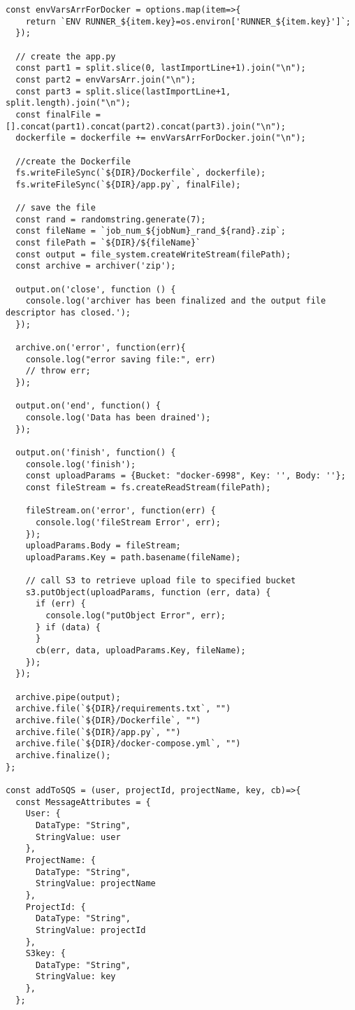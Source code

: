 \documentclass[12pt,oneside]{amsart}
\begin{document}
\begin{Verbatim}[fontsize=\tiny, frame=single]
  const envVarsArrForDocker = options.map(item=>{
    return `ENV RUNNER_${item.key}=os.environ['RUNNER_${item.key}']`;
  });

  // create the app.py
  const part1 = split.slice(0, lastImportLine+1).join("\n");
  const part2 = envVarsArr.join("\n");
  const part3 = split.slice(lastImportLine+1, split.length).join("\n");
  const finalFile = [].concat(part1).concat(part2).concat(part3).join("\n");
  dockerfile = dockerfile += envVarsArrForDocker.join("\n");

  //create the Dockerfile
  fs.writeFileSync(`${DIR}/Dockerfile`, dockerfile);
  fs.writeFileSync(`${DIR}/app.py`, finalFile);

  // save the file
  const rand = randomstring.generate(7);
  const fileName = `job_num_${jobNum}_rand_${rand}.zip`;
  const filePath = `${DIR}/${fileName}`
  const output = file_system.createWriteStream(filePath);
  const archive = archiver('zip');

  output.on('close', function () {
    console.log('archiver has been finalized and the output file descriptor has closed.');
  });

  archive.on('error', function(err){
    console.log("error saving file:", err)
    // throw err;
  });

  output.on('end', function() {
    console.log('Data has been drained');
  });

  output.on('finish', function() {
    console.log('finish');
    const uploadParams = {Bucket: "docker-6998", Key: '', Body: ''};
    const fileStream = fs.createReadStream(filePath);

    fileStream.on('error', function(err) {
      console.log('fileStream Error', err);
    });
    uploadParams.Body = fileStream;
    uploadParams.Key = path.basename(fileName);

    // call S3 to retrieve upload file to specified bucket
    s3.putObject(uploadParams, function (err, data) {
      if (err) {
        console.log("putObject Error", err);
      } if (data) {
      }
      cb(err, data, uploadParams.Key, fileName);
    });
  });

  archive.pipe(output);
  archive.file(`${DIR}/requirements.txt`, "")
  archive.file(`${DIR}/Dockerfile`, "")
  archive.file(`${DIR}/app.py`, "")
  archive.file(`${DIR}/docker-compose.yml`, "")
  archive.finalize();
};

const addToSQS = (user, projectId, projectName, key, cb)=>{
  const MessageAttributes = {
    User: {
      DataType: "String",
      StringValue: user
    },
    ProjectName: {
      DataType: "String",
      StringValue: projectName
    },
    ProjectId: {
      DataType: "String",
      StringValue: projectId
    },
    S3key: {
      DataType: "String",
      StringValue: key
    },
  };


\end{Verbatim}
\end{document}
